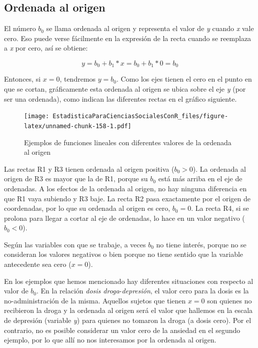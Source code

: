 \documentclass[]{book}
\begin{document}
\hypertarget{ordenada-al-origen}{%
\subsection{Ordenada al origen}\label{ordenada-al-origen}}

El número \(b_{0}\) se llama ordenada al origen y representa el valor de
\emph{y} cuando \emph{x} vale cero. Eso puede verse fácilmente en la expresión de
la recta cuando se reemplaza a \emph{x} por cero, así se obtiene:

\[y = b_{0} + b_{1}*x = b_{0} + b_{1}*0 = b_{0}\]

Entonces, si \(x = 0\), tendremos \(y = b_0\). Como los ejes
tienen el cero en el punto en que se cortan, gráficamente esta ordenada
al origen se ubica sobre el eje \emph{y} (por ser una ordenada), como indican
las diferentes rectas en el gráfico siguiente.

\begin{figure}
\centering
\texttt{[image: EstadisticaParaCienciasSocialesConR\_files/figure-latex/unnamed-chunk-158-1.pdf]}
\caption{\label{fig:unnamed-chunk-158}Ejemplos de funciones lineales con diferentes valores de la ordenada al origen}
\end{figure}

Las rectas R1 y R3 tienen ordenada al origen positiva (\(b_{0} > 0\)). La ordenada al origen de R3 es mayor que la de R1, porque su \(b_{0}\) está más arriba en el eje de ordenadas. A los efectos de la ordenada al origen, no hay ninguna diferencia en que R1 vaya subiendo y R3 baje. La recta R2 pasa exactamente por el origen de coordenadas, por lo que su ordenada al origen es cero, \(b_{0} = 0\). La recta R4, si se prolona para llegar a cortar al eje de ordenadas, lo hace en un valor negativo (\(b_{0} < 0\)).

Según las variables con que se trabaje, a veces \(b_{0}\) no tiene
interés, porque no se consideran los valores negativos o bien porque no tiene sentido que la variable antecedente sea cero (\(x=0\)).

En los ejemplos que hemos mencionado hay diferentes situaciones con
respecto al valor de \(b_{0}\). En la relación \emph{dosis droga}-\emph{depresión}, el valor cero para la dosis es la no-administración de la misma. Aquellos sujetos que tienen \(x = 0\) son quienes no recibieron la droga y
la ordenada al origen será el valor que hallemos en la escala de
depresión (variable \emph{y}) para quienes no tomaron la droga (a dosis
cero). Por el contrario, no es posible considerar un valor cero de la
ansiedad en el segundo ejemplo, por lo que allí no nos interesamos por la ordenada al origen.
\end{document}
